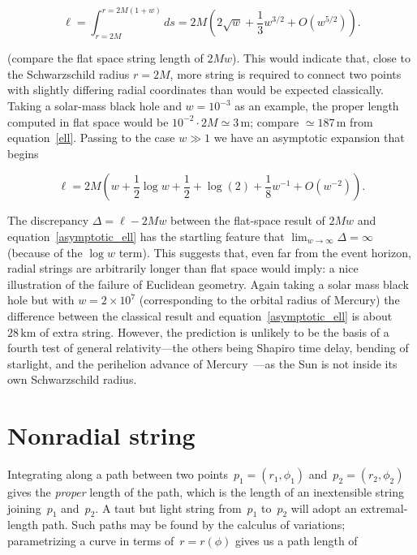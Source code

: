 \documentclass{ws-tpe}
\begin{document}

 \begin{equation}\label{ell}
   \ell =
   \int_{r=2M}^{r=2M(1+w)}ds
   =2M\left(2\sqrt{w} + \frac{1}{3}w^{3/2} + O(w^{5/2})\right).
 \end{equation}

(compare the flat space string length of $2Mw$).  This would indicate
 that, close to the Schwarzschild radius $r=2M$, more string is
 required to connect two points with slightly differing radial
 coordinates than would be expected classically.  Taking a solar-mass
 black hole and $w=10^{-3}$ as an example, the proper length computed
 in flat space would be $10^{-2}\cdot 2M\simeq 3\,\mathrm{m}$; compare
 $\simeq 187\,\mathrm{m}$ from equation~\ref{ell}.  Passing to the
 case $w\gg 1$ we have an asymptotic expansion that begins

% 
\begin{equation}\label{asymptotic_ell}
  \ell = 2M\left(w +  \frac{1}{2}\log w + \frac{1}{2} + \log(2)  +  \frac{1}{8}w^{-1} + O(w^{-2})\right).
\end{equation}


\noindent The discrepancy $\Delta=\ell-2Mw$ between the flat-space result of $2Mw$ and
equation~\ref{asymptotic_ell} has the startling feature that $\lim_{w\longrightarrow\infty}\Delta=\infty$ (because of the $\log w$ term).  This suggests that, even far from the event
horizon, radial strings are arbitrarily longer than flat space would
imply: a nice illustration of the failure of Euclidean geometry.
Again taking a solar mass black hole but with $w=2\times 10^7$
(corresponding to the orbital radius of Mercury) the difference
between the classical result and equation~\ref{asymptotic_ell} is
about $28\,\mathrm{km}$ of extra string.  However, the prediction is
unlikely to be the basis of a fourth test of general relativity---the
others being Shapiro time delay, bending of starlight, and the
perihelion advance of Mercury~\cite{einstein1916}---as the Sun is not
inside its own Schwarzschild radius.

\section{Nonradial string}
Integrating along a path between two
points~$p_1=\left(r_1,\phi_1\right)$ and~$p_2=\left(r_2,\phi_2\right)$
gives the {\em proper} length of the path, which is the length of an
inextensible string joining~$p_1$ and~$p_2$.  A taut but light string
from~$p_1$ to~$p_2$ will adopt an extremal-length path.  Such paths
may be found by the calculus of variations; parametrizing a curve in
terms of~$r=r\left(\phi\right)$ gives us a path length of
\end{document}
